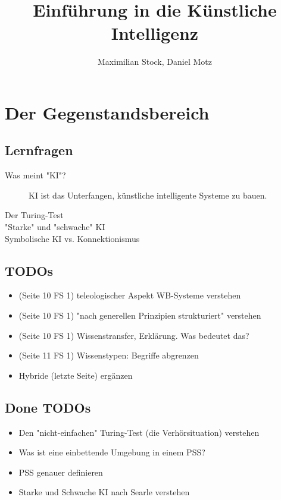 \documentclass[runningheads,deutsch]{llncs}
\begin{document}
%
\title{
    Einführung in die Künstliche Intelligenz
}
%
%
\author{Maximilian Stock, Daniel Motz}
%
%
%
\maketitle %
%

\parindent0mm
\section{Der Gegenstandsbereich}
\subsection{Lernfragen}
\begin{description}
  \item[Was meint "KI"?] KI ist das Unterfangen, künstliche intelligente Systeme zu bauen. 
  \item[Der Turing-Test]
  \item["Starke" und "schwache" KI]
  \item[Symbolische KI vs. Konnektionismus]
\end{description}

\subsection{TODOs}
\begin{itemize}
    \item (Seite 10 FS 1) teleologischer Aspekt WB-Systeme verstehen
    \item (Seite 10 FS 1) "nach generellen Prinzipien strukturiert" verstehen
    \item (Seite 10 FS 1) Wissenstransfer, Erklärung. Was bedeutet das?
    \item (Seite 11 FS 1) Wissenstypen: Begriffe abgrenzen
    \item Hybride (letzte Seite) ergänzen
\end{itemize} 

\subsection*{Done TODOs}
\begin{itemize}
    \item Den "nicht-einfachen" Turing-Test (die Verhörsituation) verstehen
    \item Was ist eine einbettende Umgebung in einem PSS?
    \item PSS genauer definieren
    \item Starke und Schwache KI nach Searle verstehen
\end{itemize}
\end{document}
